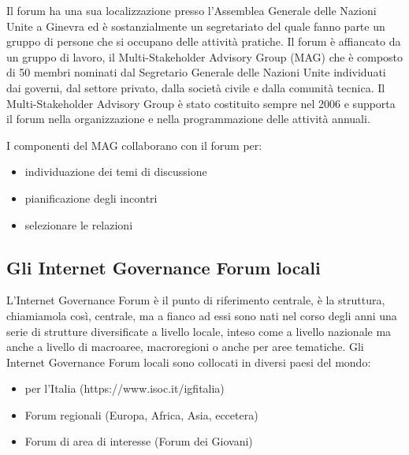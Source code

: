Il forum ha una sua localizzazione presso l'Assemblea Generale delle Nazioni Unite a Ginevra ed è sostanzialmente un segretariato del quale fanno parte un gruppo di persone che si occupano delle attività pratiche. Il forum è affiancato da un gruppo di lavoro, il Multi-Stakeholder Advisory Group (MAG) che è composto di 50 membri nominati dal Segretario Generale delle Nazioni Unite individuati dai governi, dal settore privato, dalla società civile e dalla comunità tecnica. Il Multi-Stakeholder Advisory Group è stato costituito sempre nel 2006 e supporta il forum nella organizzazione e nella programmazione delle attività annuali.\par
I componenti del MAG collaborano con il forum per:
\begin{itemize}
    \item individuazione dei temi di discussione
    \item pianificazione degli incontri
    \item selezionare le relazioni
\end{itemize}

\subsection{Gli Internet Governance Forum locali}

L'Internet Governance Forum è il punto di riferimento centrale, è la struttura, chiamiamola così, centrale, ma a fianco ad essi sono nati nel corso degli anni una serie di strutture diversificate a livello locale, inteso come a livello nazionale ma anche a livello di macroaree, macroregioni o anche per aree tematiche. Gli Internet Governance Forum locali sono collocati in diversi paesi del mondo:
\begin{itemize}
    \item per l'Italia  (https://www.isoc.it/igfitalia)
    \item Forum regionali (Europa, Africa, Asia, eccetera)
    \item Forum di area di interesse (Forum dei Giovani)
\end{itemize}

